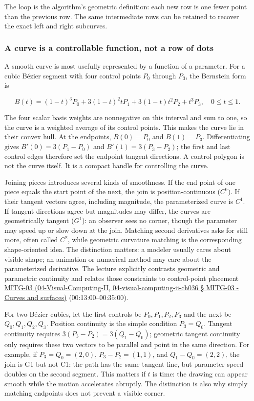 The loop is the algorithm's geometric definition: each new row is one fewer point than the previous row. The same intermediate rows can be retained to recover the exact left and right subcurves.

\subsubsection{A curve is a controllable function, not a row of dots}\label{a-curve-is-a-controllable-function-not-a-row-of-dots}

A smooth curve is most usefully represented by a function of a parameter. For a cubic Bézier segment with four control points \(P_0\) through \(P_3\), the Bernstein form is

\[
B(t)=(1-t)^3P_0+3(1-t)^2tP_1+3(1-t)t^2P_2+t^3P_3,\quad 0\le t\le1.
\]

The four scalar basis weights are nonnegative on this interval and sum to one, so the curve is a weighted average of its control points. This makes the curve lie in their convex hull. At the endpoints, \(B(0)=P_0\) and \(B(1)=P_3\). Differentiating gives \(B'(0)=3(P_1-P_0)\) and \(B'(1)=3(P_3-P_2)\); the first and last control edges therefore set the endpoint tangent directions. A control polygon is not the curve itself. It is a compact handle for controlling the curve.

Joining pieces introduces several kinds of smoothness. If the end point of one piece equals the start point of the next, the join is position-continuous (\(C^0\)). If their tangent vectors agree, including magnitude, the parameterized curve is \(C^1\). If tangent directions agree but magnitudes may differ, the curves are geometrically tangent (\(G^1\)): an observer sees no corner, though the parameter may speed up or slow down at the join. Matching second derivatives asks for still more, often called \(C^2\), while geometric curvature matching is the corresponding shape-oriented idea. The distinction matters: a modeler usually cares about visible shape; an animation or numerical method may care about the parameterized derivative. The lecture explicitly contrasts geometric and parametric continuity and relates those constraints to control-point placement \href{}{MITG-03 (04-Visual-Computing-II, 04-visual-computing-ii-ch036 § MITG-03 - Curves and surfaces)} (00:13:00--00:35:00).

For two Bézier cubics, let the first controls be \(P_0,P_1,P_2,P_3\) and the next be \(Q_0,Q_1,Q_2,Q_3\). Position continuity is the simple condition \(P_3=Q_0\). Tangent continuity requires \(3(P_3-P_2)=3(Q_1-Q_0)\); geometric tangent continuity only requires these two vectors to be parallel and point in the same direction. For example, if \(P_3=Q_0=(2,0)\), \(P_3-P_2=(1,1)\), and \(Q_1-Q_0=(2,2)\), the join is G1 but not C1: the path has the same tangent line, but parameter speed doubles on the second segment. This matters if \(t\) is time: the drawing can appear smooth while the motion accelerates abruptly. The distinction is also why simply matching endpoints does not prevent a visible corner.

